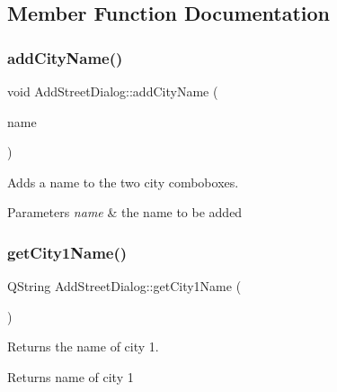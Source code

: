 \subsection{Member Function Documentation}
\mbox{\label{class_add_street_dialog_a78dbf0fdb7a3f345ceabaf14b0439fd1}} 
\subsubsection{\texorpdfstring{add\+City\+Name()}{addCityName()}}
{\footnotesize\ttfamily void Add\+Street\+Dialog\+::add\+City\+Name (\begin{DoxyParamCaption}\item[{Q\+String}]{name }\end{DoxyParamCaption})}



Adds a name to the two city comboboxes. 


\begin{DoxyParams}{Parameters}
{\em name} & the name to be added \\
\hline
\end{DoxyParams}
\mbox{\label{class_add_street_dialog_a180380683de12d32099d9aacf19673ae}} 
\subsubsection{\texorpdfstring{get\+City1\+Name()}{getCity1Name()}}
{\footnotesize\ttfamily Q\+String Add\+Street\+Dialog\+::get\+City1\+Name (\begin{DoxyParamCaption}{ }\end{DoxyParamCaption})}



Returns the name of city 1. 

\begin{DoxyReturn}{Returns}
name of city 1 
\end{DoxyReturn}
\mbox{\label{class_add_street_dialog_a119252f87220d48c4a49d64a96c0f5fd}} 
